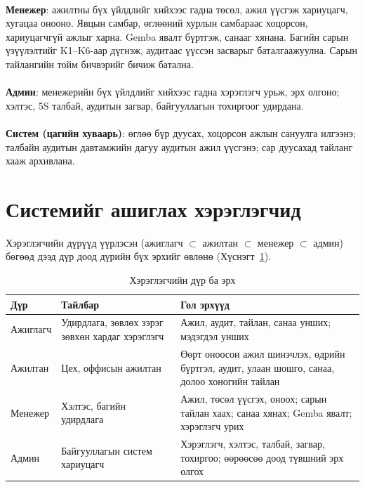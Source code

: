 \paragraph{}\textbf{Менежер}: ажилтны бүх үйлдлийг хийхээс гадна төсөл, ажил үүсгэж хариуцагч, хугацаа онооно. Явцын самбар, өглөөний хурлын самбараас хоцорсон, хариуцагчгүй ажлыг харна. Gemba явалт бүртгэж, санааг хянана. Багийн сарын үзүүлэлтийг K1--K6-аар дүгнэж, аудитаас үүссэн засварыг баталгаажуулна. Сарын тайлангийн тойм бичвэрийг бичиж батална.

\paragraph{}\textbf{Админ}: менежерийн бүх үйлдлийг хийхээс гадна хэрэглэгч урьж, эрх олгоно; хэлтэс, 5S талбай, аудитын загвар, байгууллагын тохиргоог удирдана.

\paragraph{}\textbf{Систем (цагийн хуваарь)}: өглөө бүр дуусах, хоцорсон ажлын сануулга илгээнэ; талбайн аудитын давтамжийн дагуу аудитын ажил үүсгэнэ; сар дуусахад тайланг хааж архивлана.

\section{Системийг ашиглах хэрэглэгчид}
Хэрэглэгчийн дүрүүд үүрлэсэн (ажиглагч $\subset$ ажилтан $\subset$ менежер $\subset$ админ) бөгөөд дээд дүр доод дүрийн бүх эрхийг өвлөнө (Хүснэгт~\ref{table:roles}).

\begin{table}[H]
\centering
\caption{Хэрэглэгчийн дүр ба эрх}
\label{table:roles}
\begin{tabular}{|p{2.8cm}|p{4.4cm}|p{7.2cm}|}
\hline
\textbf{Дүр} & \textbf{Тайлбар} & \textbf{Гол эрхүүд} \\ \hline
Ажиглагч & Удирдлага, зөвлөх зэрэг зөвхөн хардаг хэрэглэгч & Ажил, аудит, тайлан, санаа унших; мэдэгдэл унших \\ \hline
Ажилтан & Цех, оффисын ажилтан & Өөрт оноосон ажил шинэчлэх, өдрийн бүртгэл, аудит, улаан шошго, санаа, долоо хоногийн тайлан \\ \hline
Менежер & Хэлтэс, багийн удирдлага & Ажил, төсөл үүсгэх, оноох; сарын тайлан хаах; санаа хянах; Gemba явалт; хэрэглэгч урих \\ \hline
Админ & Байгууллагын систем хариуцагч & Хэрэглэгч, хэлтэс, талбай, загвар, тохиргоо; өөрөөсөө доод түвшний эрх олгох \\ \hline
\end{tabular}
\end{table}

